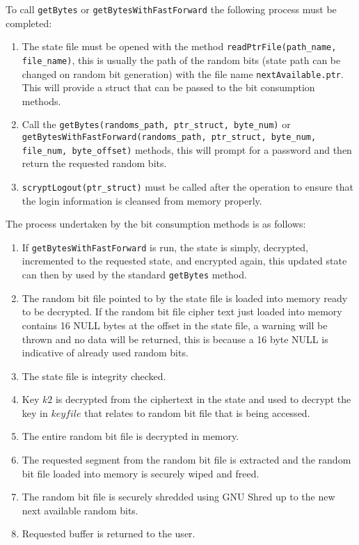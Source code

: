 \documentclass{paper}
\begin{document}
					To call \texttt{getBytes} or \texttt{getBytesWithFastForward} the following process must be completed:
					\begin{enumerate}
						\setlength\itemsep{-0.3em}
						\item The state file must be opened with the method \texttt{readPtrFile(path\_name, file\_name)}, this is usually the path of the random bits (state path can be changed on random bit generation) with the file name \texttt{nextAvailable.ptr}. This will provide a struct that can be passed to the bit consumption methods.
						\item Call the \texttt{getBytes(randoms\_path, ptr\_struct, byte\_num)} or \texttt{getBytesWithFastForward(randoms\_path, ptr\_struct, byte\_num, file\_num, byte\_offset)} methods, this will prompt for a password and then return the requested random bits.
						\item \texttt{scryptLogout(ptr\_struct)} must be called after the operation to ensure that the login information is cleansed from memory properly.
					\end{enumerate}
					
					The process undertaken by the bit consumption methods is as follows:
					\begin{enumerate}
						\setlength\itemsep{-0.3em}
						\item If \texttt{getBytesWithFastForward} is run, the state is simply, decrypted, incremented to the requested state, and encrypted again, this updated state can then by used by the standard \texttt{getBytes} method.
						\item The random bit file pointed to by the state file is loaded into memory ready to be decrypted. If the random bit file cipher text just loaded into memory contains 16 NULL bytes at the offset in the state file, a warning will be thrown and no data will be returned, this is because a 16 byte NULL is indicative of already used random bits.
						\item The state file is integrity checked.
						\item Key $\mathit{k2}$ is decrypted from the ciphertext in the state and used to decrypt the key in $\mathit{keyfile}$ that relates to random bit file that is being accessed.
						\item The entire random bit file is decrypted in memory.
						\item The requested segment from the random bit file is extracted and the random bit file loaded into memory is securely wiped and freed.
						\item The random bit file is securely shredded using GNU Shred up to the new next available random bits.
						\item Requested buffer is returned to the user.
					\end{enumerate}
\end{document}
